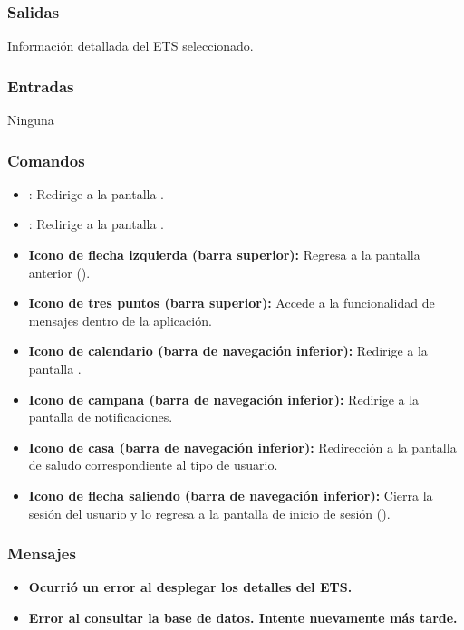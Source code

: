 \subsubsection{Salidas}
Información detallada del ETS seleccionado.

\subsubsection{Entradas}
Ninguna

\subsubsection{Comandos}
\begin{itemize}
	\item {}: Redirige a la pantalla .
	\item {}: Redirige a la pantalla .
	\item \textbf{Icono de flecha izquierda (barra superior):} Regresa a la pantalla anterior ().
	\item \textbf{Icono de tres puntos (barra superior):} Accede a la funcionalidad de mensajes dentro de la aplicación.
	\item \textbf{Icono de calendario (barra de navegación inferior):} Redirige a la pantalla .
	\item \textbf{Icono de campana (barra de navegación inferior):} Redirige a la pantalla de notificaciones.
	\item \textbf{Icono de casa (barra de navegación inferior):} Redirección a la pantalla de saludo correspondiente al tipo de usuario.
	\item \textbf{Icono de flecha saliendo (barra de navegación inferior):} Cierra la sesión del usuario y lo regresa a la pantalla de inicio de sesión ().
\end{itemize}

\subsubsection{Mensajes}
\begin{itemize}
	\item \textbf{Ocurrió un error al desplegar los detalles del ETS.}
	\item \textbf{Error al consultar la base de datos. Intente nuevamente más tarde.}
\end{itemize}

